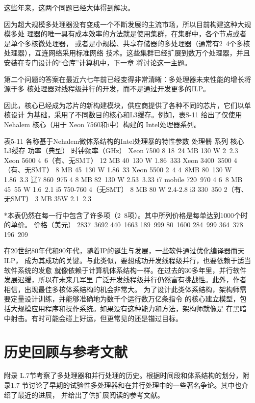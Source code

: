 这些年来，这两个同题已经大体得到解决。

因为超大规模多处理器没有变成一个不断发展的主流市场，所以目前构建这种大规模多处
理器的唯一具有成本效率的方法就是使用集群，在集群中，各个节点或者是单个多核微处理器，
或者是小规模、共享存储器的多处理器（通常有2~4个多核处理器），互连网络采用标准网络
技术。这些集群已经扩展到数万个处理器，并且安装在专门设计的“仓库”计算机中，下一章
将讨论这一主题。

第二个问题的答案在最近六七年前已经变得非常清晰：多处理器未来性能的增长将源于多
核处理器对线程级并行的开发，而不是通过开发更多的ILP。

因此，核心已经成为芯片的新构建模块，供应商提供了各种不同的芯片，它们以单核设计
为基础，采用了不同数目的核心和L3缓存。例如，表S-11 给出了仅使用 Nehalem 核心（用于
Xeon 7560和i中）构建的 Intel处理器系列。

表5-11 各称基于Nehalem微体系结构的Intel处理暴的特性参数
处理鬋
系列
核心
L3绶存
功率（典型）
时钟频率（GHz）
Xeon
7500
8
18~24 MB
130 W
2~2.3
Xeon
5600
4~6（有、无SMT）
12 MB
40~130 W
1.86~333
Xeon
3400~3500
4（有、无SMT）
8 MB
45~130 W
1.86~33
Xeon
5500
2~4
4~8MB
80~130 W
1.86~3.3
辽7
860~975
4
8 MB
82~130 W
2.53~3.33
i7 mobile
720~970
4
6~8 MB
45~55 W
1.6~2.1
i5
750-760
4（无SMT）
8 MB
80 W
2.4-2.8
i3
330~350
2（有、无SMT）
3 MB
35W
2.1~2.3

*本表仍然在每一行中包含了许多项（2~8项）。其中所列价格是每单达到1000个时的单价。
价格（美元）
2837~3692
440~1663
189~999
80~1600
284~999
364~378
196~209

在20世纪80年代和90年代，随着IP的诞生与发展，一些软件通过优化编译器而天ILP，
成为其成功的关键。与此类似，要想成功开发线程级并行，也要依赖于适当软件系统的发愈
就像依赖于计算机体系结构一样。在过去的30多年里，并行软件发展迟缓，所以在未来几军里
广泛开发线程级并行仍然富有挑战性。此外，作者相信，出现最佳多核体系结构的机会非常大。
为了设计此类体系结构，架构师需要定量设计训练，并能够准确地为数千个运行数万亿条指令
的核心建立模型，包括大规模应用程序和操作系统。如果没有这种能力和方法，架构师就像是
在黑暗中射击。有时可能会碰上好运，但更常见的还是锴过目标。
\section{历史回顾与参考文献}
附录 L.7节考察了多处理器和并行处理的历史。根据时间段和体系结构的划分，附录1.7
节讨论了早期的试验性多处理器和在并行处理中的一些著名争论。其中也介绍了最近的进展，
并给出了供扩展阅读的参考文献。

